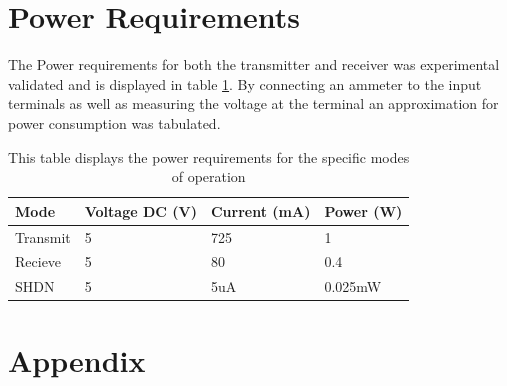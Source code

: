 \documentclass[paper=a4, fontsize=11pt]{scrartcl}
\numberwithin{equation}{section}		%
\numberwithin{figure}{section}			%
\numberwithin{table}{section}				%
\begin{document}
\section{Power Requirements}
The Power requirements for both the transmitter and receiver was experimental validated and is displayed in table \ref{power}. By connecting an ammeter to the input terminals as well as measuring the voltage at the terminal an approximation for power consumption was tabulated.


\begin{table}[H]
\begin{tabularx}{\textwidth}{ |X|X|X|X| }
\hline
Mode & Voltage DC (V) & Current (mA) & Power (W) \\ 
\hline
Transmit & 5 & 725 & 1 \\
\hline
Recieve & 5 & 80& 0.4 \\
\hline
SHDN & 5 & 5uA &0.025mW \\
\hline 
\end{tabularx}
\caption{This table displays the power requirements for the specific modes of operation }
\label{power}
\end{table}




\section{Appendix}
\end{document}
